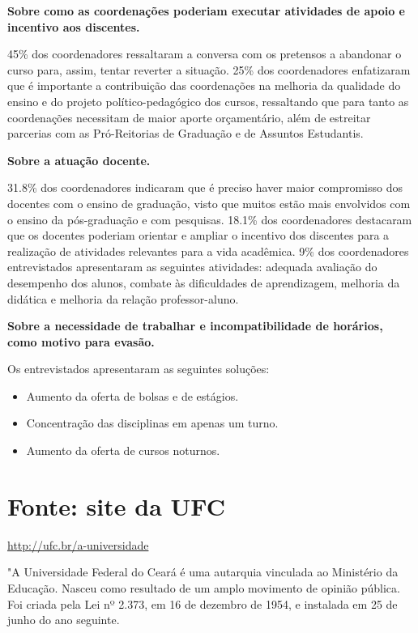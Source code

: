 \documentclass{report}
\begin{document}
\textbf{Sobre como as coordenações poderiam executar atividades de apoio e incentivo aos discentes.}

45\% dos coordenadores ressaltaram a conversa com os pretensos a abandonar o curso para, assim, tentar reverter a situação. 25\% dos coordenadores enfatizaram que é importante a contribuição das coordenações na melhoria da qualidade do ensino e do projeto político-pedagógico dos cursos, ressaltando que para tanto as coordenações necessitam de maior aporte orçamentário, além de estreitar parcerias com as Pró-Reitorias de Graduação e de Assuntos Estudantis.

\textbf{Sobre a atuação docente.}

31.8\% dos coordenadores indicaram que é preciso haver maior compromisso dos docentes com o ensino de graduação, visto que muitos estão mais envolvidos com o ensino da pós-graduação e com pesquisas. 18.1\% dos coordenadores destacaram que os docentes poderiam orientar e ampliar o incentivo dos discentes para a realização de atividades relevantes para a vida acadêmica. 9\% dos coordenadores entrevistados apresentaram as seguintes atividades: adequada avaliação do desempenho dos alunos, combate às dificuldades de aprendizagem, melhoria da didática e melhoria da relação professor-aluno.

\textbf{Sobre a necessidade de trabalhar e incompatibilidade de horários, como motivo para evasão.}

Os entrevistados apresentaram as seguintes soluções:

\begin{itemize}
\item Aumento da oferta de bolsas e de estágios.
\item Concentração das disciplinas em apenas um turno.
\item Aumento da oferta de cursos noturnos.
\end{itemize}


\section{Fonte: site da UFC}

\url{http://ufc.br/a-universidade}

"A Universidade Federal do Ceará é uma autarquia vinculada ao Ministério da Educação. Nasceu como resultado de um amplo movimento de opinião pública. Foi criada pela Lei nº 2.373, em 16 de dezembro de 1954, e instalada em 25 de junho do ano seguinte.
\end{document}
